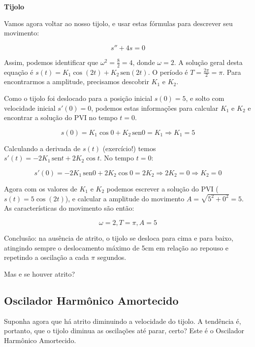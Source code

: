 \documentclass[a4paper]{article}
\providecommand{\sin}{} \renewcommand{\sin}{\hspace{2pt}\mathrm{sen}}
\begin{document}
{\bf Tijolo}

Vamos agora voltar ao nosso tijolo, e usar estas fórmulas para
descrever seu movimento:

\begin{displaymath}
  s''+4s=0
\end{displaymath}

Assim, podemos identificar que $\omega^2=\frac{8}{2}=4$, donde
$\omega=2$. A solução geral desta equação é $s(t) = K_1 \cos (2 t) + K_2 \sin (2 t)$. O período é $T=\frac{2\pi}{2}=\pi$. Para encontrarmos a
amplitude, precisamos descobrir $K_1$ e $K_2$.

Como o tijolo foi deslocado para a posição inicial $s(0)=5$, e solto
com velocidade inicial $s'(0)=0$, podemos estas informações para
calcular $K_1$ e $K_2$ e encontrar a solução do PVI no tempo $t=0$.

\begin{displaymath}
  s(0) = K_1 \cos0 + K_2 \sin 0 = K_1 \Rightarrow K_1 = 5
\end{displaymath}

Calculando a derivada de $s(t)$ (exercício!) temos
$s'(t) = -2K_1 \sin t + 2K_2 \cos t$. No tempo $t=0$:

\begin{displaymath}
  s'(0) = -2K_1 \sin 0 + 2K_2 \cos 0 = 2K_2 \Rightarrow 2K_2 = 0
  \Rightarrow K_2=0
\end{displaymath}

Agora com os valores de $K_1$ e $K_2$ podemos escrever a solução do
PVI ($s(t) = 5\cos(2t)$), e calcular a amplitude do movimento $A = \sqrt{5^2 +0^2} = 5$. As características do movimento são então:

\begin{displaymath}
  \omega=2, T=\pi, A = 5
\end{displaymath}

Conclusão: na ausência de atrito, o tijolo se desloca para cima e para
baixo, atingindo sempre o deslocamento máximo de 5cm em relação ao
repouso e repetindo a oscilação a cada $\pi$ segundos.

Mas e se houver atrito?

\subsection{Oscilador Harmônico Amortecido}

Suponha agora que há atrito diminuindo a velocidade do tijolo. A
tendência é, portanto, que o tijolo diminua as oscilações até parar,
certo? Este é o Oscilador Harmônico Amortecido.
\end{document}
